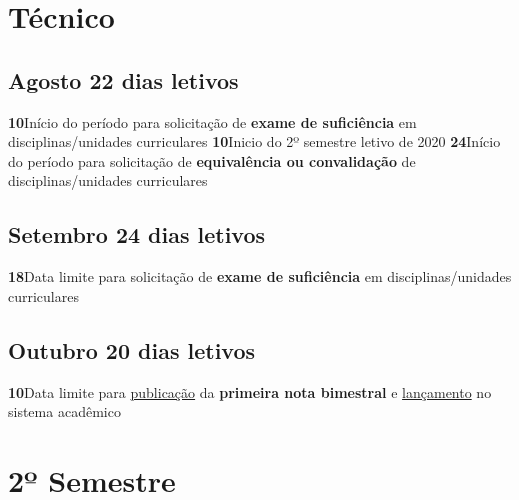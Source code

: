 \documentclass[thesis]{hmcposter}
\begin{document}
\begin{poster}
\section{\color{hmcorange}Técnico}\subsection{Agosto \hfill 22 dias letivos}\textbf{10}\qquad Início do período para solicitação de \textbf{exame de suficiência} em disciplinas/unidades curriculares \newline\textbf{10}\qquad Inicio do 2º semestre letivo de 2020 \newline\textbf{24}\qquad Início do período para solicitação de \textbf{equivalência ou convalidação} de disciplinas/unidades curriculares \subsection{Setembro \hfill 24 dias letivos}\textbf{18}\qquad Data limite para solicitação de \textbf{exame de suficiência} em disciplinas/unidades curriculares \subsection{Outubro \hfill 20 dias letivos}\textbf{10}\qquad Data limite para \underline{publicação} da \textbf{primeira nota bimestral} e \underline{lançamento} no sistema acadêmico \vfill\null
\columnbreak
\section{\hfill \color{hmcorange}2º Semestre}

\end{poster}
\end{document}
